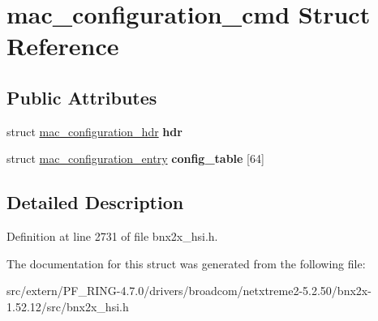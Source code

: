 \hypertarget{structmac__configuration__cmd}{
\section{mac\_\-configuration\_\-cmd Struct Reference}
\label{structmac__configuration__cmd}
}
\subsection*{Public Attributes}
\begin{DoxyCompactItemize}
\item 
\hypertarget{structmac__configuration__cmd_a01fe8bf8d1aa39b5cccf5a3c10696ef1}{
struct \hyperlink{structmac__configuration__hdr}{mac\_\-configuration\_\-hdr} {\bfseries hdr}}
\label{structmac__configuration__cmd_a01fe8bf8d1aa39b5cccf5a3c10696ef1}

\item 
\hypertarget{structmac__configuration__cmd_a5c72457e3284bfbdd818e7306dc3cc12}{
struct \hyperlink{structmac__configuration__entry}{mac\_\-configuration\_\-entry} {\bfseries config\_\-table} \mbox{[}64\mbox{]}}
\label{structmac__configuration__cmd_a5c72457e3284bfbdd818e7306dc3cc12}

\end{DoxyCompactItemize}


\subsection{Detailed Description}


Definition at line 2731 of file bnx2x\_\-hsi.h.



The documentation for this struct was generated from the following file:\begin{DoxyCompactItemize}
\item 
src/extern/PF\_\-RING-\/4.7.0/drivers/broadcom/netxtreme2-\/5.2.50/bnx2x-\/1.52.12/src/bnx2x\_\-hsi.h\end{DoxyCompactItemize}
